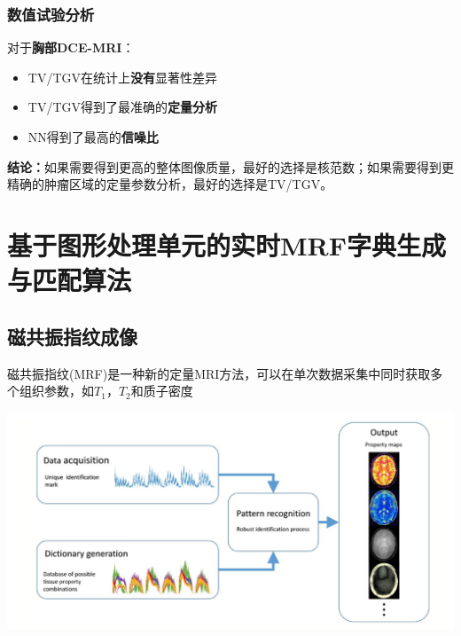 \documentclass{beamer}
\begin{document}
\begin{frame}
	\frametitle{数值试验分析}
	对于\textbf{胸部DCE-MRI}：
	\begin{itemize}
		\item TV/TGV在统计上\textbf{没有}显著性差异
		\item TV/TGV得到了最准确的\textbf{定量分析}
		\item NN得到了最高的\textbf{信噪比}
	\end{itemize}
	\vspace{0.5cm}
	\textbf{结论：}如果需要得到更高的整体图像质量，最好的选择是核范数；如果需要得到更精确的肿瘤区域的定量参数分析，最好的选择是TV/TGV。
\end{frame}

\section{基于图形处理单元的实时MRF字典生成与匹配算法}
    \begin{frame}
    \end{frame}

\subsection{磁共振指纹成像}
\begin{frame}
磁共振指纹(MRF)是一种新的定量MRI方法，可以在单次数据采集中同时获取多个组织参数，如$T_1$，$T_2$和质子密度
	\begin{minipage}{1\textwidth}
\centerline{\includegraphics[width=1.2\textwidth]{../img/intro/mrf.png}}
\end{minipage}
\end{frame}
\end{document}
